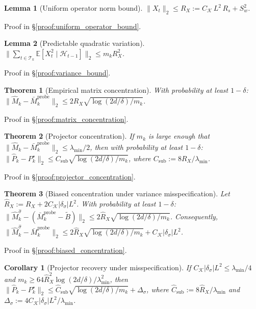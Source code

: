\documentclass{article}
\newcommand{\E}{\mathbb{E}}
\newcommand{\cH}{\mathcal{H}}
\newcommand{\cT}{\mathcal{T}}
\newtheorem{lemma}{Lemma}
\newtheorem{theorem}{Theorem}
\newtheorem{corollary}{Corollary}
\begin{document}
\begin{lemma}[Uniform operator norm bound]
\label{lem:uniform_operator_bound}
$\|X_t\|_2 \le R_X := C_{\mathcal K}\,L^2\,R_s + S_w^2$.
\end{lemma}

Proof in \S\ref{proof:uniform_operator_bound}.

\begin{lemma}[Predictable quadratic variation]
\label{lem:variance_bound}
$\|\sum_{t \in \cT_k} \E[X_t^2 \mid \cH_{t-1}]\|_2 \le m_k R_X^2$.
\end{lemma}

Proof in \S\ref{proof:variance_bound}.

\begin{theorem}[Empirical matrix concentration]
\label{thm:matrix_concentration_summary}
With probability at least $1-\delta$:
$\|\widehat{M}_k - \bar{M}_k^{\mathrm{probe}}\|_2 \le 2R_X \sqrt{\log(2d/\delta)/m_k}$.
\end{theorem}

Proof in \S\ref{proof:matrix_concentration}.

\begin{theorem}[Projector concentration]
\label{thm:projector_concentration_summary}
If $m_k$ is large enough that $\|\widehat M_k - \bar M_k^{\mathrm{probe}}\|_2 \le \lambda_{\min}/2$, then with probability at least $1-\delta$:
$\|\widehat{P}_k - P_k^\star\|_2 \le C_{\mathrm{sub}}\sqrt{\log(2d/\delta)/m_k}$, where $C_{\mathrm{sub}} := 8R_X/\lambda_{\min}$.
\end{theorem}

Proof in \S\ref{proof:projector_concentration}.

\begin{theorem}[Biased concentration under variance misspecification]
\label{thm:biased_concentration}
Let $\hat R_X := R_X + 2C_{\mathcal K}|\delta_\sigma|L^2$.
With probability at least $1-\delta$:
$\|\widehat M_k^{\hat\sigma} - (\bar M_k^{\mathrm{probe}} - \widetilde B)\|_2 \le 2\hat R_X\sqrt{\log(2d/\delta)/m_k}$.
Consequently, $\|\widehat M_k^{\hat\sigma} - \bar M_k^{\mathrm{probe}}\|_2 \le 2\hat R_X\sqrt{\log(2d/\delta)/m_k} + C_{\mathcal K}|\delta_\sigma|L^2$.
\end{theorem}

Proof in \S\ref{proof:biased_concentration}.

\begin{corollary}[Projector recovery under misspecification]
\label{cor:projector_misspec}
If $C_{\mathcal K}|\delta_\sigma|L^2 \le \lambda_{\min}/4$ and $m_k \ge 64\hat R_X^2\log(2d/\delta)/\lambda_{\min}^2$, then
$\|\widehat P_k - P_k^\star\|_2 \le \hat C_{\mathrm{sub}}\sqrt{\log(2d/\delta)/m_k} + \Delta_\sigma$,
where $\hat C_{\mathrm{sub}} := 8\hat R_X/\lambda_{\min}$ and $\Delta_\sigma := 4C_{\mathcal K}|\delta_\sigma|L^2/\lambda_{\min}$.
\end{corollary}
\end{document}
